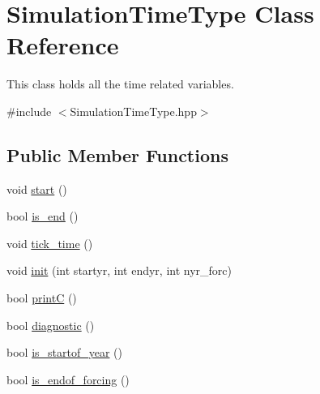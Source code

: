 \hypertarget{class_simulation_time_type}{}\section{Simulation\+Time\+Type Class Reference}
\label{class_simulation_time_type}


This class holds all the time related variables.  




{\ttfamily \#include $<$Simulation\+Time\+Type.\+hpp$>$}

\subsection*{Public Member Functions}
\begin{DoxyCompactItemize}
\item 
void \mbox{\hyperlink{class_simulation_time_type_a271e291f8da1ae72337d456ce3899f3c}{start}} ()
\item 
bool \mbox{\hyperlink{class_simulation_time_type_a9bd3924c0990cef013132553c30eb844}{is\+\_\+end}} ()
\item 
void \mbox{\hyperlink{class_simulation_time_type_a5a0171330f407e1293c6fdf489055278}{tick\+\_\+time}} ()
\item 
void \mbox{\hyperlink{class_simulation_time_type_aa657511a4786bfd2778ce33fbaf5e3b8}{init}} (int startyr, int endyr, int nyr\+\_\+forc)
\item 
bool \mbox{\hyperlink{class_simulation_time_type_a56b971d5c4f04df090fcc7ce9764f5b9}{printC}} ()
\item 
bool \mbox{\hyperlink{class_simulation_time_type_a5ae58a97a898a812bcd24cf83ac5f6ea}{diagnostic}} ()
\item 
bool \mbox{\hyperlink{class_simulation_time_type_a3d01a0896fa801e277566bf1b2ec69d4}{is\+\_\+startof\+\_\+year}} ()
\item 
bool \mbox{\hyperlink{class_simulation_time_type_a3a35775fa077823a5849b288ae70d196}{is\+\_\+endof\+\_\+forcing}} ()
\end{DoxyCompactItemize}
